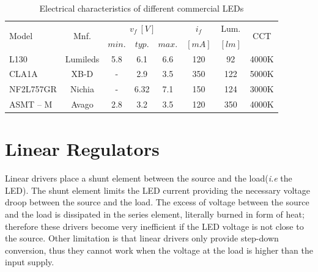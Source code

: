 \begin{table}[!h]
\centering
\caption{Electrical characteristics of different commercial LEDs}
\label{tab:vf_values}
\renewcommand{\arraystretch}{1.5}%
\begin{tabular}{l | c | c |c | c | c | c | c  }
 \multirow{2}{*}{ Model} & \multirow{2}{*}{ Mnf.} & \multicolumn{3}{c|}{ $v_f~[V]$ }  & $i_f$ & Lum. & \multirow{2}{*}{ CCT }  \\ \cline{3-7}
  & & $min.$ & $typ.$ & $max.$ & $[mA]$ & $[lm]$ &  \\
  \midrule
  L130 & Lumileds & 5.8 & 6.1 & 6.6 & 120 & 92 & 4000K\\
  CLA1A & XB-D    &  -  & 2.9 & 3.5 & 350  &  122 & 5000K\\
  NF2L757GR & Nichia & - & 6.32 & 7.1 & 150 & 124 & 3000K\\
  ASMT – M & Avago  & 2.8 & 3.2  & 3.5 & 120 & 350 &  4000K

\end{tabular}
\end{table}

\section{Linear Regulators}
Linear drivers place a shunt element between the source and the load(\emph{i.e} the LED). The shunt element limits the LED current providing the necessary voltage droop between the source and the load. The excess of voltage between the source and the load is dissipated in the series element, literally burned in form of heat; therefore these drivers become very inefficient if the LED voltage is not close to the source. Other limitation is that linear drivers only provide step-down conversion, thus they cannot work when the voltage at the load is higher than the input supply.

